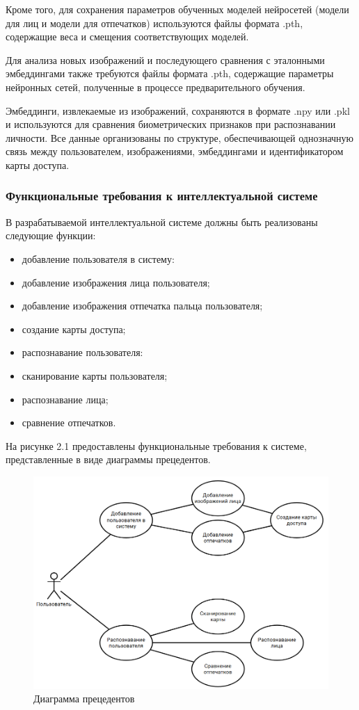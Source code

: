Кроме того, для сохранения параметров обученных моделей нейросетей (модели для лиц и модели для отпечатков) используются файлы формата .pth, содержащие веса и смещения соответствующих моделей.

Для анализа новых изображений и последующего сравнения с эталонными эмбеддингами также требуются файлы формата .pth, содержащие параметры нейронных сетей, полученные в процессе предварительного обучения.

Эмбеддинги, извлекаемые из изображений, сохраняются в формате .npy или .pkl и используются для сравнения биометрических признаков при распознавании личности. Все данные организованы по структуре, обеспечивающей однозначную связь между пользователем, изображениями, эмбеддингами и идентификатором карты доступа.

\subsubsection{Функциональные требования к интеллектуальной системе}

В разрабатываемой интеллектуальной системе должны
быть реализованы следующие функции: 
\begin{itemize}
	\item добавление пользователя в систему:
   	\item добавление изображения лица пользователя;
    \item добавление изображения отпечатка пальца пользователя;
    \item создание карты доступа;
    \item распознавание пользователя:
	\item сканирование карты пользователя;
	\item распознавание лица;
	\item сравнение отпечатков.
\end{itemize}

На рисунке 2.1 предоставлены функциональные требования к системе,
представленные в виде диаграммы прецедентов.
\begin{figure}[H]
	\centering
	\includegraphics[width=1\linewidth]{images/UML}
	\caption{Диаграмма прецедентов}
	\label{fig:uml}
\end{figure}

